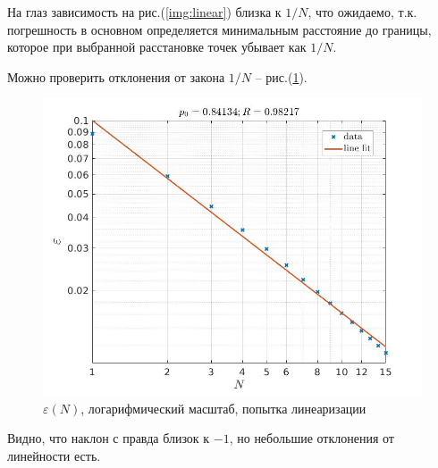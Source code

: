 \documentclass[a4paper,12pt]{article} %
\begin{document}
На глаз зависимость на рис.(\ref{img:linear}) близка к $1/N$, что ожидаемо, т.к. погрешность в основном определяется минимальным расстояние до границы, которое при выбранной расстановке точек убывает как $1/N$. 

Можно проверить отклонения от закона $1/N$ -- рис.(\ref{img:log}).

\begin{figure}[h!]
\begin{center}
\includegraphics[width=1\textwidth]{./pics/log}
\end{center}
\caption{$\varepsilon(N)$, логарифмический масштаб, попытка линеаризации} \label{img:log}
\end{figure}

Видно, что наклон с правда близок к $-1$, но небольшие отклонения от линейности есть.
\end{document}
